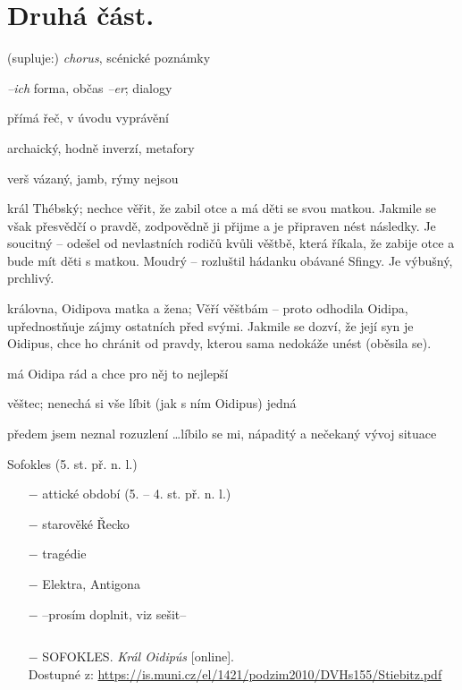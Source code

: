 \documentclass{article}
\begin{document}
\section{Druhá část.}
\begin{description}
    \setlength\itemsep{0.15em}
    \item[vypravěč:] (supluje:) \textit{chorus}, scénické poznámky
    \item[vyprávěcí způsopby:] \textit{--ich} forma, občas \textit{--er}; dialogy
    \item[typy promluv:] přímá řeč, v úvodu vyprávění
    \item[jazyková stránka:] archaický, hodně inverzí, metafory
    \item[veršová výstavba:] verš vázaný, jamb, rýmy nejsou
    \item[postavy:]
        \begin{description}
            \setlength\itemsep{0.15em}
            \item[Oidipus,] král Thébský; nechce věřit, že zabil otce a má děti se svou matkou. Jakmile se však přesvědčí o pravdě, zodpovědně ji přijme a je připraven nést následky. Je soucitný -- odešel od nevlastních rodičů kvůli věštbě, která říkala, že zabije otce a bude mít děti s matkou. Moudrý -- rozluštil hádanku obávané Sfingy. Je výbušný, prchlivý.
            \item[Iokasté,] královna, Oidipova matka a žena; Věří věštbám -- proto odhodila Oidipa, upřednostňuje zájmy ostatních před svými. Jakmile se dozví, že její syn je  Oidipus, chce ho chránit od pravdy, kterou sama nedokáže unést (oběsila se).
            \item[Kreón,] má Oidipa rád a chce pro něj to nejlepší
            \item[Teiresias,] věštec; nenechá si vše líbit (jak s ním Oidipus) jedná
        \end{description}
    \item[názor:] předem jsem neznal rozuzlení \dots líbilo se mi, nápaditý a nečekaný vývoj situace
    \item[kontext:] Sofokles (5. st. př. n. l.) \vspace{-0.5em}
        \setlength\itemsep{0em}
        \begin{itemize}
            \item[$-$] attické období (5. -- 4. st. př. n. l.)
            \item[$-$] starověké Řecko
            \item[$-$] tragédie
            \item[$-$] Elektra, Antigona
            \item[$-$] --prosím doplnit, viz sešit--
        \end{itemize}
    \item[zdroje:] $ $
    \begin{itemize}
        \setlength\itemsep{0em}
        \item[$-$] SOFOKLES. \textit{Král Oidipús} [online]. \\
        Dostupné z: \url{https://is.muni.cz/el/1421/podzim2010/DVHs155/Stiebitz.pdf}
    \end{itemize}
\end{description}
\end{document}
